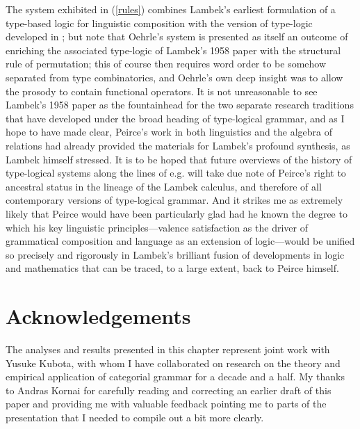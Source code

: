 \documentclass[output=paper,colorlinks,citecolor=brown]{langscibook}
\begin{document}
The system exhibited in (\ref{rules}) combines Lambek's earliest formulation
of a type-based logic for linguistic composition with the version of
type-logic developed in \citet{oehrle1994}; but note that Oehrle's system is
presented as itself an outcome of enriching the associated type-logic
of Lambek's 1958 paper with the structural rule of permutation; this
of course then requires word order to be somehow separated from type
combinatorics, and Oehrle's own deep insight was to allow the prosody
to contain functional operators. It is not unreasonable to see
Lambek's 1958 paper as the fountainhead for the two separate research
traditions that have developed under the broad heading of type-logical
grammar, and as I hope to have made clear, Peirce's work in both
linguistics and the algebra of relations had already provided the
materials for Lambek's profound synthesis, as Lambek himself stressed.
It is to be hoped that future overviews of the history of type-logical
systems along the lines of e.g. \citet{moortgat2010} will take due note of Peirce's right to
ancestral status in the lineage of the Lambek calculus, and therefore
of all contemporary versions of type-logical grammar. And it strikes
me as extremely likely that Peirce would have been
particularly glad had he known the degree to which his key
linguistic principles---valence satisfaction as the driver of
grammatical composition and language as an extension of logic---would
be unified so precisely and rigorously in Lambek's brilliant fusion
of developments in logic and mathematics that can be traced, to a large
extent, back to Peirce himself.




\section*{Acknowledgements}
The analyses and results
presented in this chapter represent joint work with Yusuke Kubota, with whom I
have collaborated on research on the theory and empirical application of
categorial grammar for a decade and a half. My thanks to Andras Kornai
for carefully reading and correcting an earlier draft of this paper
and providing me with valuable feedback pointing me to parts of
the presentation that I needed to compile out a bit more clearly.

{\sloppy\printbibliography[heading=subbibliography,notkeyword=this]}
\end{document}
